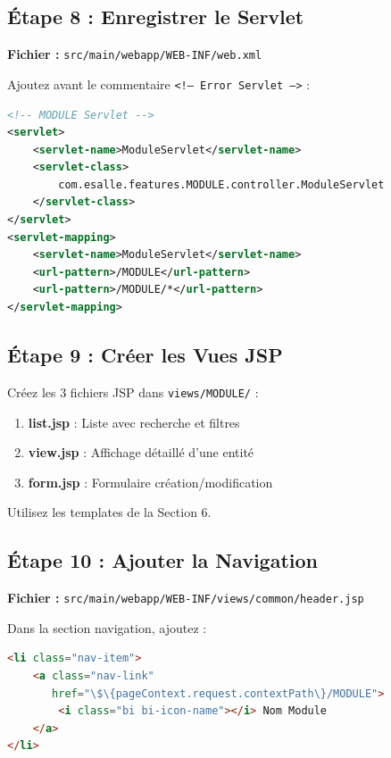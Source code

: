 \documentclass[12pt,a4paper]{article}
\begin{document}
\subsection{Étape 8 : Enregistrer le Servlet}

\textbf{Fichier :} \texttt{src/main/webapp/WEB-INF/web.xml}

Ajoutez avant le commentaire \texttt{<!-- Error Servlet -->} :

\begin{lstlisting}[language=XML]
<!-- MODULE Servlet -->
<servlet>
    <servlet-name>ModuleServlet</servlet-name>
    <servlet-class>
        com.esalle.features.MODULE.controller.ModuleServlet
    </servlet-class>
</servlet>
<servlet-mapping>
    <servlet-name>ModuleServlet</servlet-name>
    <url-pattern>/MODULE</url-pattern>
    <url-pattern>/MODULE/*</url-pattern>
</servlet-mapping>
\end{lstlisting}

\subsection{Étape 9 : Créer les Vues JSP}

Créez les 3 fichiers JSP dans \texttt{views/MODULE/} :

\begin{enumerate}
    \item \textbf{list.jsp} : Liste avec recherche et filtres
    \item \textbf{view.jsp} : Affichage détaillé d'une entité
    \item \textbf{form.jsp} : Formulaire création/modification
\end{enumerate}

Utilisez les templates de la Section 6.

\subsection{Étape 10 : Ajouter la Navigation}

\textbf{Fichier :} \texttt{src/main/webapp/WEB-INF/views/common/header.jsp}

Dans la section navigation, ajoutez :

\begin{lstlisting}[language=HTML]
<li class="nav-item">
    <a class="nav-link" 
       href="\$\{pageContext.request.contextPath\}/MODULE">
        <i class="bi bi-icon-name"></i> Nom Module
    </a>
</li>
\end{lstlisting}
\end{document}
